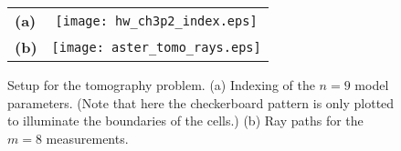 \documentclass[11pt,titlepage,fleqn]{article}
\begin{document}



\begin{figure}[h]
\centering
\begin{tabular}{lc}
{\bf(a)} & \texttt{[image: hw\_ch3p2\_index.eps]} \\
{\bf(b)} & \texttt{[image: aster\_tomo\_rays.eps]} \\
\end{tabular}
\caption[]
{{
Setup for the tomography problem.
(a) Indexing of the $n=9$ model parameters.
(Note that here the checkerboard pattern is only plotted to illuminate the boundaries of the cells.)
(b) Ray paths for the $m=8$ measurements.
\label{fig:index}
}}
\end{figure} 

\end{document}
